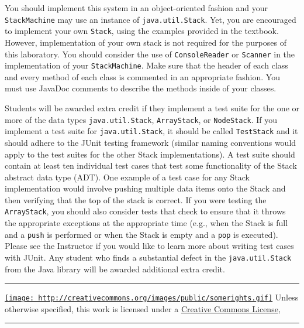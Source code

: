 You should implement this system in an object-oriented fashion and your
\texttt{StackMachine} may use an instance of \texttt{java.util.Stack}.
Yet, you are encouraged to implement your own \texttt{Stack}, using the
examples provided in the textbook. However, implementation of your own
stack is not required for the purposes of this laboratory. You should
consider the use of \texttt{ConsoleReader} or \texttt{Scanner} in the
implementation of your \texttt{StackMachine}. Make sure that the header
of each class and every method of each class is commented in an
appropriate fashion. You must use JavaDoc comments to describe the
methods inside of your classes.

Students will be awarded extra credit if they implement a test suite for
the one or more of the data types \texttt{java.util.Stack},
\texttt{ArrayStack}, or \texttt{NodeStack}. If you implement a test
suite for \texttt{java.util.Stack}, it should be called
\texttt{TestStack} and it should adhere to the JUnit testing framework
(similar naming conventions would apply to the test suites for the other
Stack implementations). A test suite should contain at least ten
individual test cases that test some functionality of the Stack abstract
data type (ADT). One example of a test case for any Stack implementation
would involve pushing multiple data items onto the Stack and then
verifying that the top of the stack is correct. If you were testing the
\texttt{ArrayStack}, you should also consider tests that check to ensure
that it throws the appropriate exceptions at the appropriate time (e.g.,
when the Stack is full and a \texttt{push} is performed or when the
Stack is empty and a \texttt{pop} is executed). Please see the
Instructor if you would like to learn more about writing test cases with
JUnit. Any student who finds a substantial defect in the
\texttt{java.util.Stack} from the Java library will be awarded
additional extra credit.

\begin{center}\rule{3in}{0.4pt}\end{center}

\href{http://creativecommons.org/licenses/by-nc/1.0/}{\texttt{[image: http://creativecommons.org/images/public/somerights.gif]}}
Unless otherwise specified, this work is licensed under a
\href{http://creativecommons.org/licenses/by-nc/1.0/}{Creative Commons
License},

\begin{center}\rule{3in}{0.4pt}\end{center}
